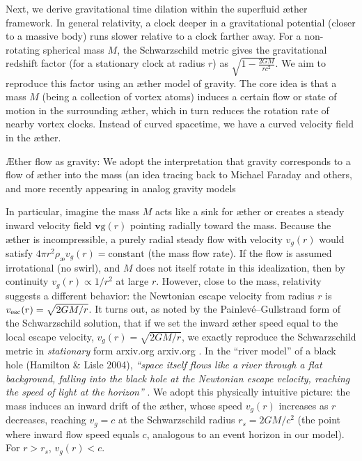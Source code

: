 \documentclass[aps,preprint,superscriptaddress]{revtex4}
\begin{document}
Next, we derive gravitational time dilation within the superfluid æther framework. In general relativity, a clock deeper in a gravitational potential (closer to a massive body) runs slower relative to a clock farther away. For a non-rotating spherical mass $M$, the Schwarzschild metric gives the gravitational redshift factor (for a stationary clock at radius $r$) as $\sqrt{1-\frac{2GM}{r c^2}}$. We aim to reproduce this factor using an æther model of gravity. The core idea is that a mass $M$ (being a collection of vortex atoms) induces a certain flow or state of motion in the surrounding æther, which in turn reduces the rotation rate of nearby vortex clocks. Instead of curved spacetime, we have a curved velocity field in the æther.


Æther flow as gravity: We adopt the interpretation that gravity corresponds to a flow of æther into the mass (an idea tracing back to Michael Faraday and others, and more recently appearing in analog gravity models


In particular, imagine the mass $M$ acts like a sink for æther or creates a steady inward velocity field $\mathbf{v}\text{g}(r)$ pointing radially toward the mass. Because the æther is incompressible, a purely radial steady flow with velocity $v_g(r)$ would satisfy $4\pi r^2 \rho_{\text{\ae}} v_g(r) = \text{constant}$ (the mass flow rate). If the flow is assumed irrotational (no swirl), and $M$ does not itself rotate in this idealization, then by continuity $v_g(r) \propto 1/r^2$ at large $r$. However, close to the mass, relativity suggests a different behavior: the Newtonian escape velocity from radius $r$ is $v_{\rm esc}(r) = \sqrt{2GM/r}$. It turns out, as noted by the Painlevé–Gullstrand form of the Schwarzschild solution, that if we set the inward æther speed equal to the local escape velocity, $v_g(r)=\sqrt{2GM/r}$, we exactly reproduce the Schwarzschild metric in \textit{stationary} form arxiv.org
 arxiv.org
. In the “river model” of a black hole (Hamilton & Lisle 2004), \textit{“space itself flows like a river through a flat background, falling into the black hole at the Newtonian escape velocity, reaching the speed of light at the horizon”}
. We adopt this physically intuitive picture: the mass induces an inward drift of the æther, whose speed $v_g(r)$ increases as $r$ decreases, reaching $v_g = c$ at the Schwarzschild radius $r_s = 2GM/c^2$ (the point where inward flow speed equals $c$, analogous to an event horizon in our model). For $r > r_s$, $v_g(r) < c$.
\end{document}
